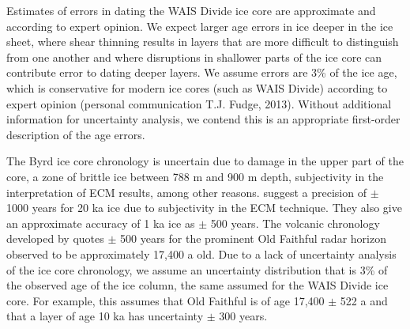 \documentclass[12pt]{article}
\begin{document}
Estimates of errors in dating the WAIS Divide ice core are approximate and according to expert opinion. We expect larger age errors in ice deeper in the ice sheet, where shear thinning results in layers that are more difficult to distinguish from one another and where disruptions in shallower parts of the ice core can contribute error to dating deeper layers. We assume errors are 3\% of the ice age, which is conservative for modern ice cores (such as WAIS Divide) according to expert opinion (personal communication T.J. Fudge, 2013). Without additional information for uncertainty analysis, we contend this is an appropriate first-order description of the age errors. %

The Byrd ice core chronology is uncertain due to damage in the upper part of the core, a zone of brittle ice between 788 m and 900 m depth, subjectivity in the interpretation of ECM results, among other reasons. \citet{hammer1994} suggest a precision of $\pm$ 1000 years for 20 ka ice due to subjectivity in the ECM technique. They also give an approximate accuracy of 1 ka ice as $\pm$ 500 years. The volcanic chronology developed by \citet{hammer1997} quotes $\pm$ 500 years for the prominent Old Faithful radar horizon observed to be approximately 17,400 a old. Due to a lack of uncertainty analysis of the ice core chronology, we assume an uncertainty distribution that is 3\% of the observed age of the ice column, the same assumed for the WAIS Divide ice core. For example, this assumes that Old Faithful is of age 17,400 $\pm$ 522 a and that a layer of age 10 ka has uncertainty $\pm$ 300 years. 


\end{document}
